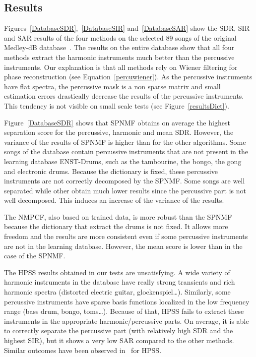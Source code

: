 \subsection{Results} 
\label{subResults}

Figures~\ref{DatabaseSDR},~\ref{DatabaseSIR} and~\ref{DatabaseSAR} show the SDR, SIR and SAR results of the four methods on the selected $89$ songs of the original Medley-dB database~\cite{bittner2014medleydb}. The results on the entire database show that all four methods extract the harmonic instruments much better than the percussive instruments. Our explanation is that all methods rely on Wiener filtering for phase reconstruction (see Equation~\eqref{percuwiener}). As the percussive instruments have flat spectra, the percussive mask is a non sparse matrix and small estimation errors drastically decrease the results of the percussive instruments. This tendency is not visible on small scale tests (see Figure~\ref{resultsDict}). 

Figure~\ref{DatabaseSDR} shows that SPNMF obtains on average the highest separation score for the percussive, harmonic and mean SDR. However, the variance of the results of SPNMF is higher than for the other algorithms. Some songs of the database contain percussive instruments that are not present in the learning database ENST-Drums, such as the tambourine, the bongo, the gong and electronic drums. Because the dictionary is fixed, these percussive instruments are not correctly decomposed by the SPNMF. Some songs are well separated while other obtain much lower results since the percussive part is not well decomposed. This induces an increase of the variance of the results. 

The NMPCF, also based on trained data, is more robust than the SPNMF because the dictionary that extract the drums is not fixed. It allows more freedom and the results are more consistent even if some percussive instruments are not in the learning database. However, the mean score is lower than in the case of the SPNMF.

The HPSS results obtained in our tests are unsatisfying. A wide variety of harmonic instruments in the database have really strong transients and rich harmonic spectra (distorted electric guitar, glockenspiel\ldots). Similarly, some percussive instruments have sparse basis functions localized in the low frequency range (bass drum, bongo, toms\ldots). Because of that, HPSS fails to extract these instruments in the appropriate harmonic/percussive parts. On average, it is able to correctly separate the percussive part (with relatively high SDR and the highest SIR), but it shows a very low SAR compared to the other methods. Similar outcomes have been observed in~\cite{canadas2014percussive} for HPSS.

